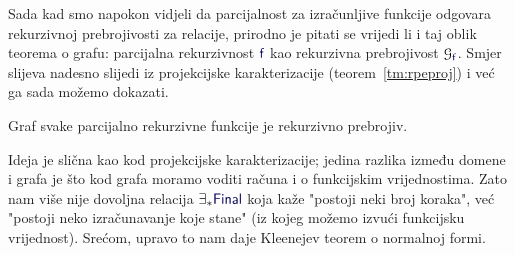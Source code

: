Sada kad smo napokon vidjeli da parcijalnost za izračunljive funkcije odgovara rekurzivnoj prebrojivosti za relacije, prirodno je pitati se vrijedi li i taj oblik teorema o grafu: parcijalna rekurzivnost $\f f$ kao rekurzivna prebrojivost $\graf{\f f}$. Smjer slijeva nadesno slijedi iz projekcijske karakterizacije (teorem~\ref{tm:rpeproj}) i već ga sada možemo dokazati.

\begin{teorem}[{name=[rekurzivna prebrojivost grafova parcijalno rekurzivnih funkcija]}]\label{tm:grafprre}
Graf svake parcijalno rekurzivne funkcije je rekurzivno prebrojiv.
\end{teorem}

Ideja je slična kao kod projekcijske karakterizacije; jedina razlika između domene i grafa je što kod grafa moramo voditi računa i o funkcijskim vrijednostima. Zato nam više nije dovoljna relacija $\exists_*\f{Final}$ koja kaže "postoji neki broj koraka", već "postoji neko izračunavanje koje stane" (iz kojeg možemo izvući funkcijsku vrijednost). Srećom, upravo to nam daje Kleenejev teorem o normalnoj formi.

